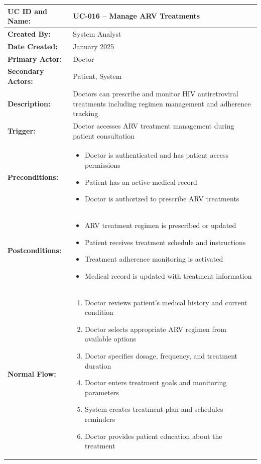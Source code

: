 \documentclass[12pt,a4paper]{article}
\begin{document}
\renewcommand{\arraystretch}{1.5}
\begin{longtable}{|p{4.5cm}|p{10.5cm}|}
\hline
\textbf{UC ID and Name:} & UC-016 – Manage ARV Treatments \\
\hline
\textbf{Created By:} & System Analyst \\
\hline
\textbf{Date Created:} & January 2025 \\
\hline
\textbf{Primary Actor:} & Doctor \\
\hline
\textbf{Secondary Actors:} & Patient, System \\
\hline
\textbf{Description:} & Doctors can prescribe and monitor HIV antiretroviral treatments including regimen management and adherence tracking \\
\hline
\textbf{Trigger:} & Doctor accesses ARV treatment management during patient consultation \\
\hline
\textbf{Preconditions:} &
\begin{itemize}
  \item Doctor is authenticated and has patient access permissions
  \item Patient has an active medical record
  \item Doctor is authorized to prescribe ARV treatments
\end{itemize} \\
\hline
\textbf{Postconditions:} &
\begin{itemize}
  \item ARV treatment regimen is prescribed or updated
  \item Patient receives treatment schedule and instructions
  \item Treatment adherence monitoring is activated
  \item Medical record is updated with treatment information
\end{itemize} \\
\hline
\textbf{Normal Flow:} &
\begin{enumerate}
  \item Doctor reviews patient's medical history and current condition
  \item Doctor selects appropriate ARV regimen from available options
  \item Doctor specifies dosage, frequency, and treatment duration
  \item Doctor enters treatment goals and monitoring parameters
  \item System creates treatment plan and schedules reminders
  \item Doctor provides patient education about the treatment

\end{enumerate}
\end{longtable}
\end{document}
